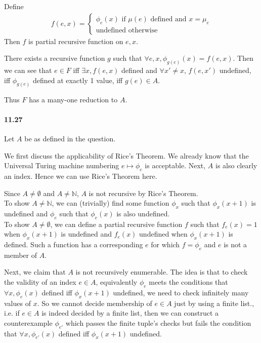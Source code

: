 \documentclass{article}
\begin{document}
Define
\begin{align*}
	f(e,x)=\begin{cases}
		\phi_e(x) \text{ if }\mu(e)\text{ defined and }x=\mu_e\\
		\text{undefined otherwise}	
	\end{cases}
\end{align*}
Then $f$ is partial recursive function on $e,x$.

There exists a recursive function $g$ such that $\forall e,x, \phi_{g(e)}(x)=f(e,x)$. Then we can see that $e\in F$ iff $\exists x, f(e,x)$ defined and $\forall x'\neq x$, $f(e,x')$ undefined, iff $\phi_{g(e)}$ defined at exactly 1 value, iff $g(e)\in A$.

Thus $F$ has a many-one reduction to $A$.

\paragraph{11.27} Let $A$ be as defined in the question. 

We first discuss the applicability of Rice's Theorem. We already know that the Universal Turing machine numbering $e\mapsto \phi_e$ is acceptable. Next, $A$ is also clearly an index. Hence we can use Rice's Theorem here.

Since $A\neq \emptyset$ and $A\neq \mathbb{N}$, $A$ is not recursive by Rice's Theorem.\\
To show $A\neq \mathbb{N}$, we can (trivially) find some function $\phi_x$ such that $\phi_x(x+1)$ is undefined and $\phi_e$ such that $\phi_e(x)$ is also undefined.\\
To show $A\neq \emptyset$, we can define a partial recursive function $f$ such that $f_e(x)=1$ when $\phi_x(x+1)$ is undefined and $f_e(x)$ undefined when $\phi_x(x+1)$ is defined. Such a function has a corresponding $e$ for which $f=\phi_e$ and $e$ is not a member of $A$.

Next, we claim that $A$ is not recursively enumerable. The idea is that to check the validity of an index $e\in A$, equivalently $\phi_e$ meets the conditions that $\forall x, \phi_e(x)$ defined iff $\phi_x(x+1)$ undefined, we need to check infinitely many values of $x$. So we cannot decide membership of $e\in A$ just by using a finite list., i.e. if $e\in A$ is indeed decided by a finite list, then we can construct a counterexample $\phi_{e'}$ which passes the finite tuple's checks but fails the condition that $\forall x, \phi_{e'}(x)$ defined iff $\phi_{x}(x+1)$ undefined.
\end{document}
